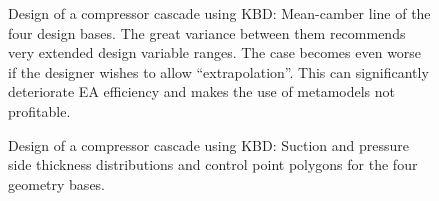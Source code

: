\begin{figure}[h!]
\begin{minipage}[b]{1\linewidth}
 \centering
\end{minipage}
\caption{Design of a compressor cascade using KBD: Mean-camber line of the four design bases. The great variance between them recommends very extended design variable ranges. The case becomes even worse if the designer wishes to allow ``extrapolation''. This can significantly deteriorate EA efficiency and makes the use of metamodels not profitable. } 
\label{CBRDmm}
\end{figure}

\begin{figure}[h!]
\begin{minipage}[b]{1\linewidth}
 \centering
\end{minipage}
\caption{Design of a compressor cascade using KBD: Suction and pressure side thickness distributions and control point polygons for the four geometry bases.} 
\label{CBRDtt}
\end{figure}


